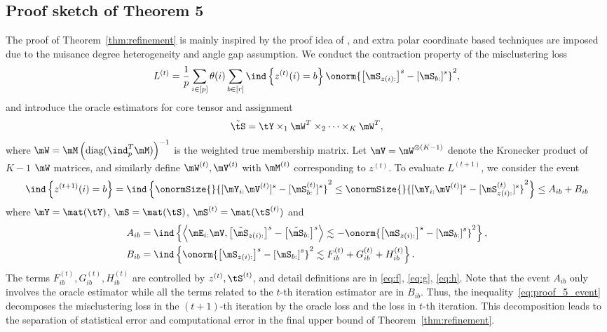 \documentclass[lettersize,onecolumn,journal]{IEEEtran}
\theoremstyle{definition}
\theoremstyle{definition}
\newcommand{\of}[1]{\left(#1\right)}
\newcommand{\off}[1]{\left[#1\right]}
\newcommand{\offf}[1]{\left\{#1\right\}}
\newcommand{\ang}[1]{\left\langle#1\right\rangle}
\begin{document}
{\subsection{Proof sketch of Theorem 5}
The proof of Theorem~\ref{thm:refinement} is mainly inspired by the proof idea of  \citet[Theorem 2]{han2020exact}, and extra polar coordinate based techniques are imposed due to the nuisance degree heterogeneity and angle gap assumption. We conduct the contraction property of the misclustering loss
\begin{equation}
     L^{(t)} = \frac{1}{p}  \sum_{i \in [p]} \theta(i) \sum_{b \in [r]}  \ind \offf{ z^{(t)}(i) = b } \onorm{ \off{ \mS_{ z(i):}  }^s - \off{ \mS_{b:}  }^s  }^2,
\end{equation}
and introduce the oracle estimators for core tensor and assignment
\begin{equation}
    \tilde \tS = \tY \times_1 \mW^T \times_2 \cdots \times_K \mW^T, 
\end{equation}
where $\mW = \mM \of{ \text{diag}(\ind_{p}^T \mM) }^{-1}$ is the weighted true membership matrix. Let $ \mV = \mW^{\otimes (K-1)}$ denote the Kronecker product of $K-1$ $\mW$ matrices, and similarly define $\mW^{(t)}, \mV^{(t)}$ with $\mM^{(t)}$ corresponding to $z^{(t)}$. To evaluate $L^{(t+1)}$, we consider the event 
\begin{equation}\label{eq:proof_5_event}
    \ind \offf{ z^{(t+1)}(i) = b } = \ind \offf{       \onormSize{}{ [ \mY_{i:} \mV^{(t)}  ]^s - [\mS_{b:}^{(t)}]^s }^2 \leq \onormSize{}{ [ \mY_{i:} \mV^{(t)}  ]^s - [\mS_{z(i):}^{(t)}]^s }^2} \leq A_{ib} + B_{ib}
\end{equation}
where $\mY = \mat(\tY)$, $ \mS = \mat(\tS)$, $\mS^{(t)} = \mat(\tS^{(t)})$ and
\begin{align}
        A_{ib} &= \ind \offf{\ang{ \mE_{i:} \mV, \off{  \tilde \mS_{z(i):} }^s - \off{  \tilde \mS_{b:} }^s } \lesssim -  \onorm{ \off{ \mS_{z(i):}  }^s - \off{ \mS_{b:}  }^s  }^2 },\\
        B_{ib} &= \ind \offf{\onorm{ \off{ \mS_{z(i):}  }^s - \off{ \mS_{b:}  }^s  }^2 \lesssim F_{ib}^{(t)} + G_{ib}^{(t)} + H_{ib}^{(t)} }.
\end{align}
The terms $F_{ib}^{(t)}, G_{ib}^{(t)}, H_{ib}^{(t)}$ are controlled by $z^{(t)}, \tS^{(t)}$, and detail definitions are in \eqref{eq:f}, \eqref{eq:g}, \eqref{eq:h}. Note that the event $A_{ib}$ only involves the oracle estimator while all the terms related to the $t$-th iteration estimator are in $B_{ib}$. Thus, the inequality~\eqref{eq:proof_5_event} decomposes the misclustering loss in the $(t+1)$-th iteration by the oracle loss and the loss in $t$-th iteration. This decomposition leads to the separation of statistical error and computational error in the final upper bound of Theorem~\ref{thm:refinement}.

}
\end{document}
